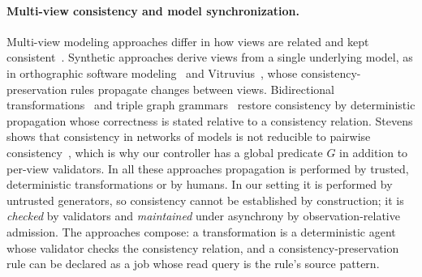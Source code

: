 \documentclass[pdflatex,sn-mathphys-num]{sn-jnl}
\theoremstyle{thmstyleone}%
\theoremstyle{thmstyletwo}%
\theoremstyle{thmstylethree}%
\begin{document}
\paragraph{Multi-view consistency and model synchronization.} Multi-view modeling approaches differ in how views are related and kept consistent~\cite{cicchetti2019multiview}. Synthetic approaches derive views from a single underlying model, as in orthographic software modeling~\cite{atkinson2010osm} and Vitruvius~\cite{klare2021vitruvius}, whose consistency-preservation rules propagate changes between views. Bidirectional transformations~\cite{czarnecki2009bx} and triple graph grammars~\cite{giese2009tgg,hermann2015tgg} restore consistency by deterministic propagation whose correctness is stated relative to a consistency relation. Stevens shows that consistency in networks of models is not reducible to pairwise consistency~\cite{stevens}, which is why our controller has a global predicate $G$ in addition to per-view validators. In all these approaches propagation is performed by trusted, deterministic transformations or by humans. In our setting it is performed by untrusted generators, so consistency cannot be established by construction; it is \emph{checked} by validators and \emph{maintained} under asynchrony by observation-relative admission. The approaches compose: a transformation is a deterministic agent whose validator checks the consistency relation, and a consistency-preservation rule can be declared as a job whose read query is the rule's source pattern.
\end{document}
